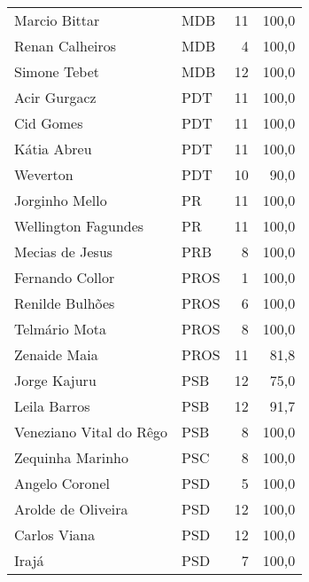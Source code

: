 \begin{longtable}{llrr}
           Marcio Bittar &            MDB &                  11 &        100,0 \\
         Renan Calheiros &            MDB &                   4 &        100,0 \\
            Simone Tebet &            MDB &                  12 &        100,0 \\
            Acir Gurgacz &            PDT &                  11 &        100,0 \\
               Cid Gomes &            PDT &                  11 &        100,0 \\
             Kátia Abreu &            PDT &                  11 &        100,0 \\
                Weverton &            PDT &                  10 &         90,0 \\
          Jorginho Mello &             PR &                  11 &        100,0 \\
     Wellington Fagundes &             PR &                  11 &        100,0 \\
         Mecias de Jesus &            PRB &                   8 &        100,0 \\
         Fernando Collor &           PROS &                   1 &        100,0 \\
         Renilde Bulhões &           PROS &                   6 &        100,0 \\
           Telmário Mota &           PROS &                   8 &        100,0 \\
            Zenaide Maia &           PROS &                  11 &         81,8 \\
            Jorge Kajuru &            PSB &                  12 &         75,0 \\
            Leila Barros &            PSB &                  12 &         91,7 \\
 Veneziano Vital do Rêgo &            PSB &                   8 &        100,0 \\
        Zequinha Marinho &            PSC &                   8 &        100,0 \\
          Angelo Coronel &            PSD &                   5 &        100,0 \\
      Arolde de Oliveira &            PSD &                  12 &        100,0 \\
            Carlos Viana &            PSD &                  12 &        100,0 \\
                   Irajá &            PSD &                   7 &        100,0 \\

\end{longtable}
